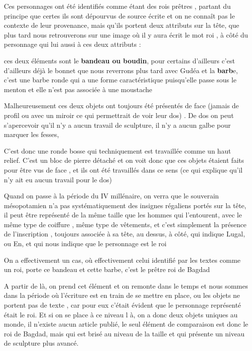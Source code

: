 \documentclass[a4paper,10pt]{article}
\begin{document}
Ces personnages ont été identifiés comme étant des rois prêtres ,
partant du principe que certes ils sont dépourvus de source écrite et
on ne connaît pas le contexte de leur provenance, mais
qu'ils portent deux attributs sur la tête, que plus
tard nous retrouverons sur une image où il y aura écrit le mot roi , à
côté du personnage qui lui aussi à ces deux attributs : 

ces deux éléments sont le \textbf{bandeau ou boudin}, pour certains
d'ailleurs c'est
d'ailleurs déjà le bonnet que nous reverrons plus tard
avec Gudéa et la \textbf{barb}e, c'est une barbe ronde
qui a une forme caractéristique puisqu'elle passe sous
le menton et elle n'est pas associée à une moustache

Malheureusement ces deux objets ont toujours été présentés de face
(jamais de profil ou avec un miroir ce qui permettrait de voir leur
dos) . De dos on peut s'apercevoir
qu'il n'y a aucun travail de
sculpture, il n'y a aucun galbe pour marquer les
fesses, 

C'est donc une ronde bosse qui techniquement est
travaillée comme un haut relief. C'est un bloc de
pierre détaché et on voit donc que ces objets étaient faits pour être
vus de face , et ils ont été travaillés dans ce sens (ce qui explique
qu'il n'y ait eu aucun travail pour
le dos)

Quand on passe à la période du IV millénaire, on verra que le souverain
mésopotamien n'a pas systématiquement des insignes
régaliens portés sur la tête, il peut être représenté de la même taille
que les hommes qui l'entourent, avec le même type de
coiffure , même type de vêtements, et c'est simplement
la présence de l'inscription , toujours associée à sa
tête, au dessus, à côté, qui indique Lugal, ou En, et qui nous indique
que le personnage est le roi

On a effectivement un cas, où effectivement celui identifié par les
textes comme un roi, porte ce bandeau et cette barbe,
c'est le prêtre roi de Bagdad

A partir de là, on prend cet élément et on remonte dans le temps et nous
sommes dans la période où l'écriture est en train de
se mettre en place, ou les objets ne portent pas de texte , car pour
eux c'était évident que le personnage représenté était
le roi. Et si on se place à ce niveau l à, on a donc deux objets
uniques au monde, il n'existe aucun article publié, le
seul élément de comparaison est donc le roi de Bagdad, mais qui est
brisé au niveau de la taille et qui présente un niveau de sculpture
plus avancé.
\end{document}
